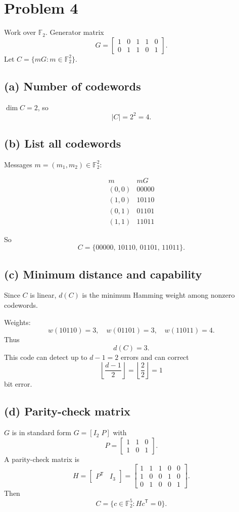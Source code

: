 \section*{Problem 4}

Work over \(\mathbb{F}_2\). Generator matrix
\[
G=
\begin{bmatrix}
1 & 0 & 1 & 1 & 0\\
0 & 1 & 1 & 0 & 1
\end{bmatrix}.
\]
Let \(C=\{mG : m\in\mathbb{F}_2^2\}\).

\subsection*{(a) Number of codewords}

\(\dim C = 2\), so
\[
|C| = 2^{2}=4.
\]

\subsection*{(b) List all codewords}

Messages \(m=(m_1,m_2)\in\mathbb{F}_2^2\):

\[
\begin{array}{c|c}
m & mG \\\hline
(0,0) & 00000\\
(1,0) & 10110\\
(0,1) & 01101\\
(1,1) & 11011
\end{array}
\]

So
\[
C=\{00000,\,10110,\,01101,\,11011\}.
\]

\subsection*{(c) Minimum distance and capability}

Since \(C\) is linear, \(d(C)\) is the minimum Hamming weight among nonzero codewords.

Weights:
\[
w(10110)=3,\quad w(01101)=3,\quad w(11011)=4.
\]
Thus
\[
d(C)=3.
\]
This code can detect up to \(d-1=2\) errors and can correct
\[
\left\lfloor\frac{d-1}{2}\right\rfloor=\left\lfloor\frac{2}{2}\right\rfloor=1
\]
bit error.

\subsection*{(d) Parity-check matrix}

\(G\) is in standard form \(G=[I_2\; P]\) with
\[
P=
\begin{bmatrix}
1 & 1 & 0\\
1 & 0 & 1
\end{bmatrix}.
\]
A parity-check matrix is
\[
H=
\begin{bmatrix}
P^{\mathsf T} & I_3
\end{bmatrix}
=
\begin{bmatrix}
1 & 1 & 1 & 0 & 0\\
1 & 0 & 0 & 1 & 0\\
0 & 1 & 0 & 0 & 1
\end{bmatrix}.
\]
Then
\[
C = \{c\in\mathbb{F}_2^5 : H c^{\mathsf T} = 0\}.
\]
